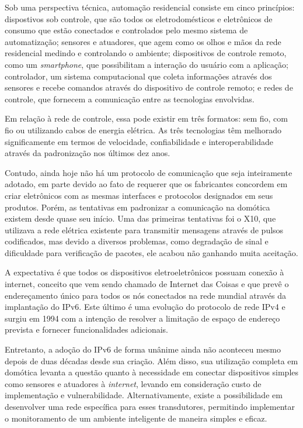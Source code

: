 Sob uma perspectiva técnica, automação residencial consiste em cinco princípios: dispostivos sob controle, que
são todos os eletrodomésticos e eletrônicos de consumo que estão conectados e controlados pelo mesmo sistema
de automatização; sensores e atuadores, que agem como os olhos e mãos da rede residencial medindo e
controlando o ambiente; dispositivos de controle remoto, como um \textit{smartphone}, que possibilitam a
interação do usuário com a aplicação; controlador, um sistema computacional que coleta informações através dos
sensores e recebe comandos através do dispositivo de controle remoto; e redes de controle, que fornecem a
comunicação entre as tecnologias envolvidas. \cite{kyas2013}

Em relação à rede de controle, essa pode existir em três formatos: sem fio, com fio ou utilizando cabos de
energia elétrica. As três tecnologias têm melhorado significamente em termos de velocidade, confiabilidade e
interoperabilidade através da padronização nos últimos dez anos. \cite{kyas2013}

Contudo, ainda hoje não há um protocolo de comunicação que seja inteiramente adotado, em parte devido ao fato
de requerer que os fabricantes concordem em criar eletrônicos com as mesmas interfaces e protocolos designados
em seus produtos. Porém, as tentativas em padronizar a comunicação na domótica existem desde quase seu início.
Uma das primeiras tentativas foi o X10, que utilizava a rede elétrica existente para transmitir mensagens
através de pulsos codificados, mas devido a diversos problemas, como degradação de sinal e dificuldade para
verificação de pacotes, ele acabou não ganhando muita aceitação. \cite{riley2012}

A expectativa é que todos os dispositivos eletroeletrônicos possuam conexão à internet, conceito que vem sendo
chamado de Internet das Coisas e que prevê o endereçamento único para todos os nós conectados na rede mundial
através da implantação do IPv6. Este último é uma evolução do protocolo de rede IPv4 e surgiu em 1994 com a
intenção de resolver a limitação de espaço de endereço prevista e fornecer funcionalidades adicionais.
\cite{hagen2002}

Entretanto, a adoção do IPv6 de forma unânime ainda não aconteceu mesmo depois de duas décadas desde sua
criação. Além disso, sua utilização completa em domótica levanta a questão quanto à necessidade em conectar
dispositivos simples como sensores e atuadores à \textit{internet}, levando em consideração custo de
implementação e vulnerabilidade. Alternativamente, existe a possibilidade em desenvolver uma rede específica
para esses transdutores, permitindo implementar o monitoramento de um ambiente inteligente de maneira simples
e eficaz.


